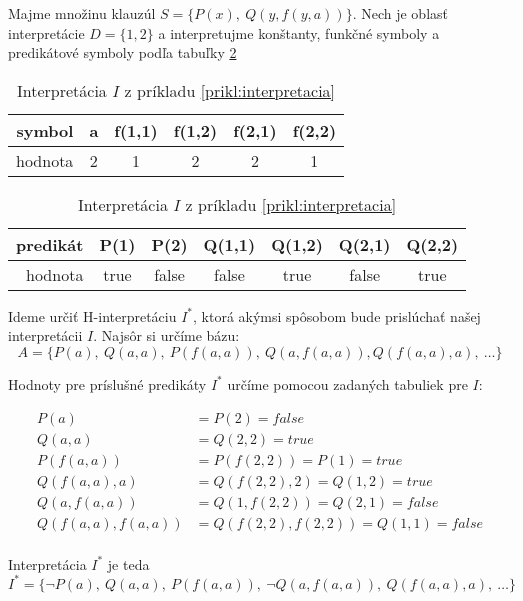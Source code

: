 \begin{priklad}
    \label{prikl:interpretacia}
    Majme množinu klauzúl $S = \{ P(x),\ Q(y, f(y,a)) \}$.
    Nech je oblasť interpretácie $D = \{1,2\}$ a interpretujme
    konštanty, funkčné symboly a predikátové symboly podľa tabuľky
    \ref{tab:priklad-interpretacia}

    \begin{table}[h]
        \centering
        \begin{tabular}{|r||c|c|c|c|c|}
            \hline
            symbol & a & f(1,1) & f(1,2) & f(2,1) & f(2,2) \\
            \hline
            hodnota & 2 & 1 & 2 & 2 & 1 \\
            \hline
        \end{tabular}
        
        \medskip
        \begin{tabular}{|r||c|c|c|c|c|c|}
            \hline
            predikát & P(1) & P(2) & Q(1,1) & Q(1,2) & Q(2,1) & Q(2,2) \\
            \hline
            hodnota & true & false & false & true & false & true \\
            \hline
        \end{tabular}
        \caption{Interpretácia $I$ z príkladu
          \ref{prikl:interpretacia}}
        \label{tab:priklad-interpretacia}
    \end{table}

    Ideme určiť H-interpretáciu $I^*$, ktorá akýmsi spôsobom bude
    prislúchať našej interpretácii $I$. Najsôr si určíme bázu:
    \begin{equation*}
        A=\{ P(a),\ Q(a,a),\ P(f(a,a)),\ Q(a,f(a,a)),
            Q(f(a,a), a),\ \ldots \}
    \end{equation*}

    Hodnoty pre príslušné predikáty $I^*$ určíme pomocou zadaných tabuliek
    pre $I$:

    \begin{align*}
        P(a) &= P(2) = false \\
        Q(a,a) &= Q(2,2) = true\\
        P(f(a,a)) &= P(f(2,2)) = P(1) =true \\
        Q(f(a,a),a) &= Q(f(2,2),2) = Q(1,2) =true \\
        Q(a,f(a,a)) &= Q(1,f(2,2)) = Q(2,1) =false \\
        Q(f(a,a),f(a,a)) &= Q(f(2,2), f(2,2)) = Q(1,1) =false \\
    \end{align*}

    Interpretácia $I^*$ je teda
    \begin{equation*}
        I^* = \{ \neg P(a),\ Q(a,a),\ P(f(a,a)),\ 
            \neg Q(a,f(a,a)),\ Q(f(a,a),a),\ \ldots \}
    \end{equation*}
\end{priklad}

